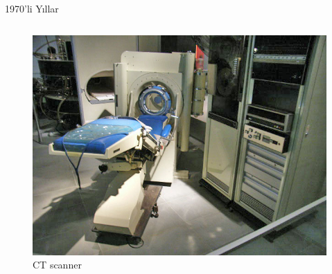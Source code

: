 \documentclass{beamer}
\begin{document}
\begin{frame}{1970'li Yıllar}
\begin{columns}
\begin{column}{0.4\textwidth}
\begin{figure}
\includegraphics[width=\textwidth]{Emi1010.jpg}
\caption{CT scanner}
\end{figure}
\end{column}
\end{columns}
\end{frame}
\end{document}
